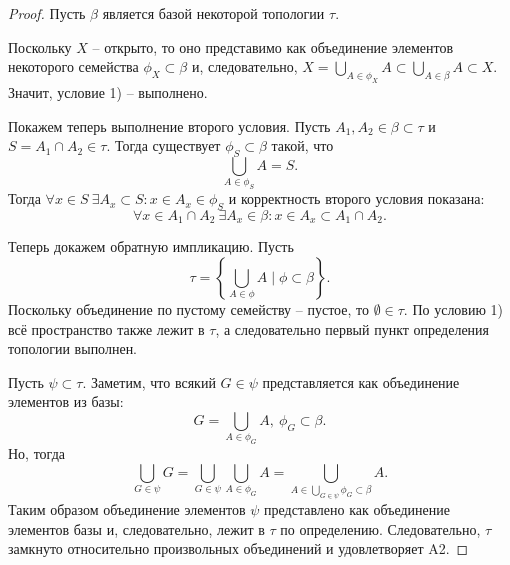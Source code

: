 \begin{proof}
    Пусть $\beta$ является базой некоторой топологии $\tau$.

    Поскольку $X$ -- открыто, то оно представимо как объединение элементов некоторого семейства $\phi_X \subset \beta$ и, следовательно, $X = \bigcup_{A \in \phi_X} A \subset \bigcup_{A \in \beta} A \subset X$.
    Значит, условие 1) -- выполнено.

    Покажем теперь выполнение второго условия.
    Пусть $A_1, A_2 \in \beta \subset \tau$ и $S = A_1 \cap A_2 \in \tau$.
    Тогда существует $\phi_S \subset \beta$ такой, что
    \[
        \bigcup_{A \in \phi_S} A = S.
    \]
    Тогда $\forall x \in S \ \exists A_x \subset S\colon x \in A_x \in \phi_S$ и корректность второго условия показана:
    \[
        \forall x \in A_1 \cap A_2 \ \exists A_x \in \beta\colon x \in A_x \subset A_1 \cap A_2.
    \]

    Теперь докажем обратную импликацию.
    Пусть
    \[
        \tau = \left\{\bigcup_{A \in \phi} A \mid \phi \subset \beta\right\}.
    \]
    Поскольку объединение по пустому семейству -- пустое, то $\emptyset \in \tau$.
    По условию 1) всё пространство также лежит в $\tau$, а следовательно первый пункт определения топологии выполнен.

    Пусть $\psi \subset \tau$.
    Заметим, что всякий $G \in \psi$ представляется как объединение элементов из базы:
    \[
        G = \bigcup_{A \in \phi_G} A, \ \phi_G \subset \beta.
    \]
    Но, тогда
    \[
        \bigcup_{G \in \psi} G = \bigcup_{G \in \psi} \bigcup_{A \in \phi_G} A = \bigcup_{A \in \bigcup_{G \in \psi} \phi_G \subset \beta} A.
    \]
    Таким образом объединение элементов $\psi$ представлено как объединение элементов базы и, следовательно, лежит в $\tau$ по определению.
    Следовательно, $\tau$ замкнуто относительно произвольных объединений и удовлетворяет A2.


\end{proof}

